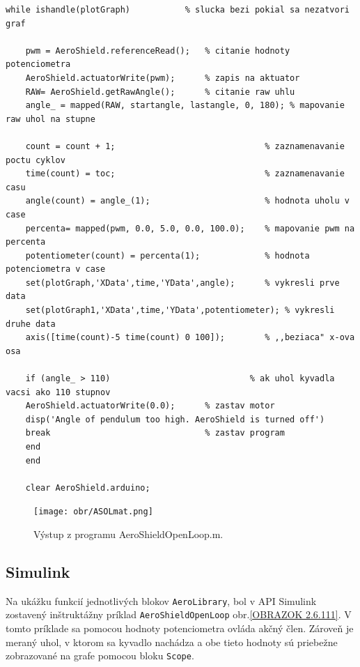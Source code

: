 \begin{lstlisting}[caption={AeroShield open loop, while cyklus.},captionpos=b]
	while ishandle(plotGraph)           % slucka bezi pokial sa nezatvori graf
	
	pwm = AeroShield.referenceRead();   % citanie hodnoty potenciometra
	AeroShield.actuatorWrite(pwm);      % zapis na aktuator
	RAW= AeroShield.getRawAngle();      % citanie raw uhlu
	angle_ = mapped(RAW, startangle, lastangle, 0, 180); % mapovanie raw uhol na stupne
	
	count = count + 1;                              % zaznamenavanie poctu cyklov
	time(count) = toc;                              % zaznamenavanie casu
	angle(count) = angle_(1);                       % hodnota uholu v case 
	percenta= mapped(pwm, 0.0, 5.0, 0.0, 100.0);    % mapovanie pwm na percenta
	potentiometer(count) = percenta(1);             % hodnota potenciometra v case
	set(plotGraph,'XData',time,'YData',angle);      % vykresli prve data
	set(plotGraph1,'XData',time,'YData',potentiometer); % vykresli druhe data  
	axis([time(count)-5 time(count) 0 100]);        % ,,beziaca" x-ova osa
	
	if (angle_ > 110)                            % ak uhol kyvadla vacsi ako 110 stupnov 
	AeroShield.actuatorWrite(0.0);      % zastav motor  
	disp('Angle of pendulum too high. AeroShield is turned off')
	break                               % zastav program
	end
	end  
	
	clear AeroShield.arduino;           
\end{lstlisting}

\begin{figure}[!tbh]
	\centering
	\texttt{[image: obr/ASOLmat.png]}
	\caption{Výstup z programu AeroShieldOpenLoop.m.}\label{OBRAZOK 3.2}
\end{figure}

\subsection{Simulink}


Na ukážku funkcií jednotlivých blokov \verb|AeroLibrary|, bol v API Simulink zostavený inštruktážny príklad \verb|AeroShieldOpenLoop| obr.\ref{OBRAZOK 2.6.111}. V tomto príklade sa pomocou hodnoty potenciometra ovláda akčný člen. Zároveň je meraný uhol, v ktorom sa kyvadlo nachádza a obe tieto hodnoty sú priebežne zobrazované na grafe pomocou bloku \verb|Scope|. 

